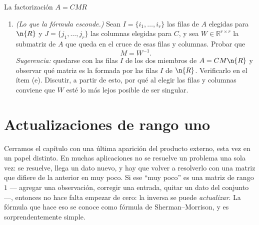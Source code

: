 \begin{entrega}{La factorización $A=CMR$}
\begin{enumerate}[label=\textbf{(\alph*)},itemsep=3pt,topsep=4pt]
\item \emph{(Lo que la fórmula esconde.)} Sean $I=\{i_1,\dots,i_r\}$ las filas
de $A$ elegidas para $\n{R}$ y $J=\{j_1,\dots,j_r\}$ las columnas elegidas para
$C$, y sea $W\in\mathbb{R}^{r\times r}$ la submatriz de $A$ que queda en el
cruce de esas filas y columnas. Probar que
\[
M = W^{-1}.
\]
\emph{Sugerencia:} quedarse con las filas $I$ de los dos miembros de
$A = CM\n{R}$ y observar qué matriz es la formada por las filas $I$ de $\n{R}$.
Verificarlo en el ítem (e). Discutir, a partir de esto, por qué al elegir las
filas y columnas conviene que $W$ esté lo más lejos posible de ser singular.

\end{enumerate}

\medskip
{}
\end{entrega}

\section{Actualizaciones de rango uno}
\label{sec:rango-uno}

Cerramos el capítulo con una última aparición del producto externo, esta vez en
un papel distinto. En muchas aplicaciones no se resuelve un problema una sola
vez: se resuelve, llega un dato nuevo, y hay que volver a resolverlo con una
matriz que difiere de la anterior en muy poco. Si ese ``muy poco'' es una matriz
de rango $1$ --- agregar una observación, corregir una entrada, quitar un dato
del conjunto ---, entonces no hace falta empezar de cero: la inversa se puede
\emph{actualizar}. La fórmula que hace eso se conoce como fórmula de
Sherman--Morrison, y es sorprendentemente simple.

